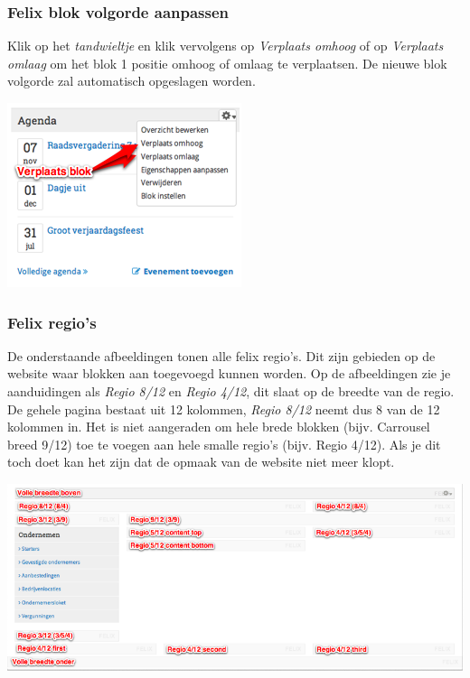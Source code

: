 \subsubsection{Felix blok volgorde aanpassen}\label{felixblokvolgorde}

Klik op het \emph{tandwieltje} en klik vervolgens op \emph{Verplaats omhoog} of op \emph{Verplaats omlaag} om het blok 1 positie omhoog of omlaag te verplaatsen. De nieuwe blok volgorde zal automatisch opgeslagen worden.

\begin{center}
	\includegraphics[scale=1.0]{img/felix3.png}
\end{center}

\subsubsection{Felix regio's}\label{felixregios}

De onderstaande afbeeldingen tonen alle felix regio's. Dit zijn gebieden op de website waar blokken aan toegevoegd kunnen worden. Op de afbeeldingen zie je aanduidingen als \emph{Regio 8/12} en \emph{Regio 4/12}, dit slaat op de breedte van de regio. De gehele pagina bestaat uit 12 kolommen, \emph{Regio 8/12} neemt dus 8 van de 12 kolommen in. Het is niet aangeraden om hele brede blokken (bijv. Carrousel breed 9/12) toe te voegen aan hele smalle regio's (bijv. Regio 4/12). Als je dit toch doet kan het zijn dat de opmaak van de website niet meer klopt.

\begin{center}
	\includegraphics[width=\textwidth]{img/felix1.png}
\end{center}

